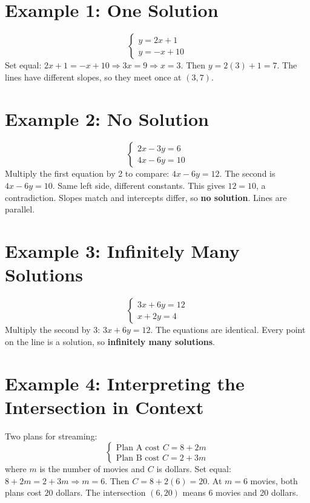 \documentclass[12pt]{article}
\begin{document}
\section*{Example 1: One Solution}

\[
\begin{cases}
y = 2x + 1\\
y = -x + 10
\end{cases}
\]
Set equal: \(2x + 1 = -x + 10 \Rightarrow 3x = 9 \Rightarrow x = 3\). Then \(y = 2(3) + 1 = 7\).  
The lines have different slopes, so they meet once at \(\boxed{(3,7)}\).

\section*{Example 2: No Solution}

\[
\begin{cases}
2x - 3y = 6\\
4x - 6y = 10
\end{cases}
\]
Multiply the first equation by 2 to compare: \(4x - 6y = 12\). The second is \(4x - 6y = 10\).  
Same left side, different constants. This gives \(12 = 10\), a contradiction.  
Slopes match and intercepts differ, so \textbf{no solution}. Lines are parallel.

\section*{Example 3: Infinitely Many Solutions}

\[
\begin{cases}
3x + 6y = 12\\
x + 2y = 4
\end{cases}
\]
Multiply the second by 3: \(3x + 6y = 12\). The equations are identical.  
Every point on the line is a solution, so \textbf{infinitely many solutions}.

\section*{Example 4: Interpreting the Intersection in Context}

Two plans for streaming:
\[
\begin{cases}
\text{Plan A cost } C = 8 + 2m\\
\text{Plan B cost } C = 2 + 3m
\end{cases}
\]
where \(m\) is the number of movies and \(C\) is dollars.  
Set equal: \(8 + 2m = 2 + 3m \Rightarrow m = 6\). Then \(C = 8 + 2(6) = 20\).  
At \(m=6\) movies, both plans cost \(20\) dollars. The intersection \((6, 20)\) means 6 movies and 20 dollars.
\end{document}
